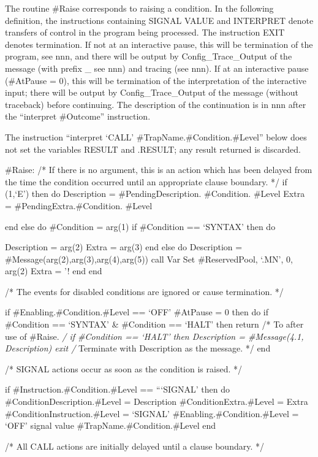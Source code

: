 The routine \#Raise corresponds to raising a condition. In the following
definition, the instructions containing SIGNAL VALUE and INTERPRET
denote transfers of control in the program being processed. The
instruction EXIT denotes termination. If not at an interactive pause,
this will be termination of the program, see nnn, and there will be
output by Config\_Trace\_Output of the message (with prefix \_ see nnn)
and tracing (see nnn). If at an interactive pause (\#AtPause = 0), this
will be termination of the interpretation of the interactive input;
there will be output by Config\_Trace\_Output of the message (without
traceback) before continuing. The description of the continuation is in
nnn after the ``interpret \#Outcome'' instruction.

The instruction ``interpret `CALL' \#TrapName.\#Condition.\#Level''
below does not set the variables RESULT and .RESULT; any result returned
is discarded.

\#Raise: /* If there is no argument, this is an action which has been
delayed from the time the condition occurred until an appropriate clause
boundary. */ if \arg(1,`E') then do Description = \#PendingDescription.
\#Condition. \#Level Extra = \#PendingExtra.\#Condition. \#Level

end else do \#Condition = arg(1) if \#Condition == `SYNTAX' then do

Description = arg(2) Extra = arg(3) end else do Description =
\#Message(arg(2),arg(3),arg(4),arg(5)) call Var Set \#ReservedPool,
`.MN', 0, arg(2) Extra = '! end end

/* The events for disabled conditions are ignored or cause termination.
*/

if \#Enabling.\#Condition.\#Level == `OFF' \textbar{} \#AtPause = 0 then
do if \#Condition == `SYNTAX' \& \#Condition == `HALT' then return /* To
after use of \#Raise. \emph{/ if \#Condition == `HALT' then Description
= \#Message(4.1, Description) exit /} Terminate with Description as the
message. */ end

/* SIGNAL actions occur as soon as the condition is raised. */

if \#Instruction.\#Condition.\#Level == ```SIGNAL' then do
\#ConditionDescription.\#Level = Description \#ConditionExtra.\#Level =
Extra \#ConditionInstruction.\#Level = `SIGNAL'
\#Enabling.\#Condition.\#Level = `OFF' signal value
\#TrapName.\#Condition.\#Level end

/* All CALL actions are initially delayed until a clause boundary. */

